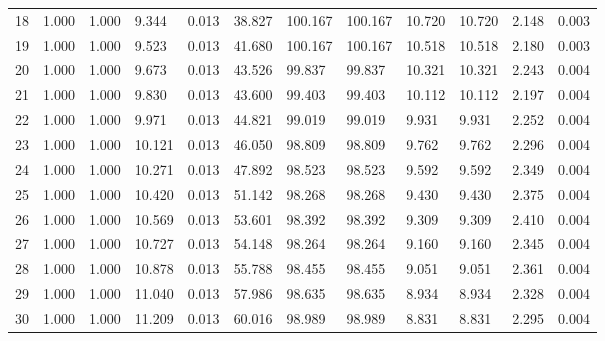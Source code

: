 \begin{tabular}{llllllllllll}
18 & 1.000 & 1.000 & 9.344 & 0.013 & 38.827 & 100.167 & 100.167 & 10.720 & 10.720 & 2.148 & 0.003 \\
19 & 1.000 & 1.000 & 9.523 & 0.013 & 41.680 & 100.167 & 100.167 & 10.518 & 10.518 & 2.180 & 0.003 \\
20 & 1.000 & 1.000 & 9.673 & 0.013 & 43.526 & 99.837 & 99.837 & 10.321 & 10.321 & 2.243 & 0.004 \\
21 & 1.000 & 1.000 & 9.830 & 0.013 & 43.600 & 99.403 & 99.403 & 10.112 & 10.112 & 2.197 & 0.004 \\
22 & 1.000 & 1.000 & 9.971 & 0.013 & 44.821 & 99.019 & 99.019 & 9.931 & 9.931 & 2.252 & 0.004 \\
23 & 1.000 & 1.000 & 10.121 & 0.013 & 46.050 & 98.809 & 98.809 & 9.762 & 9.762 & 2.296 & 0.004 \\
24 & 1.000 & 1.000 & 10.271 & 0.013 & 47.892 & 98.523 & 98.523 & 9.592 & 9.592 & 2.349 & 0.004 \\
25 & 1.000 & 1.000 & 10.420 & 0.013 & 51.142 & 98.268 & 98.268 & 9.430 & 9.430 & 2.375 & 0.004 \\
26 & 1.000 & 1.000 & 10.569 & 0.013 & 53.601 & 98.392 & 98.392 & 9.309 & 9.309 & 2.410 & 0.004 \\
27 & 1.000 & 1.000 & 10.727 & 0.013 & 54.148 & 98.264 & 98.264 & 9.160 & 9.160 & 2.345 & 0.004 \\
28 & 1.000 & 1.000 & 10.878 & 0.013 & 55.788 & 98.455 & 98.455 & 9.051 & 9.051 & 2.361 & 0.004 \\
29 & 1.000 & 1.000 & 11.040 & 0.013 & 57.986 & 98.635 & 98.635 & 8.934 & 8.934 & 2.328 & 0.004 \\
30 & 1.000 & 1.000 & 11.209 & 0.013 & 60.016 & 98.989 & 98.989 & 8.831 & 8.831 & 2.295 & 0.004 \\
\end{tabular}
